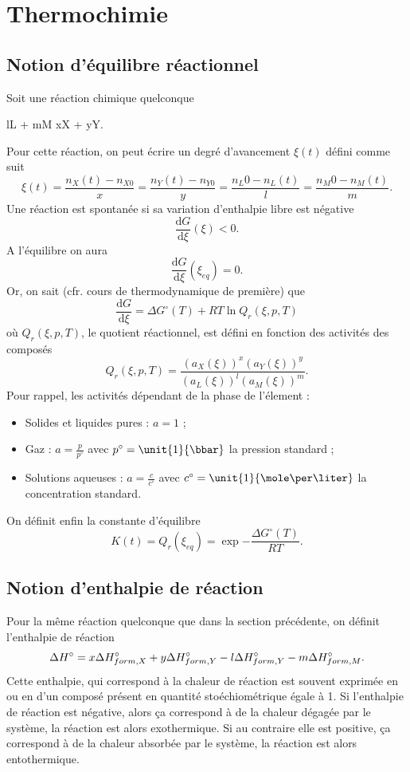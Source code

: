
\newpage
\section{Thermochimie}
\subsection{Notion d'équilibre réactionnel}
Soit une réaction chimique quelconque
\begin{chemmath}
	lL + mM  \Leftrightarrow xX + yY.
\end{chemmath}
Pour cette réaction, on peut écrire un
degré d'avancement $\xi(t)$ défini comme
suit
\[ \xi(t) = \frac{n_X(t) - n_{X0}}{x} =
\frac{n_Y(t) - n_{Y0}}{y} = \frac{n_L0 - n_{L}(t)}{l}
= \frac{n_M0 - n_{M}(t)}{m}. \]
Une réaction est spontanée si sa variation
d'enthalpie libre est négative 
\[ \frac{\mathrm{d}G}{\mathrm{d}\xi}(\xi) < 0. \]
A l'équilibre on aura 
\[ \frac{\mathrm{d}G}{\mathrm{d}\xi}(\xi_{eq}) = 0.\]
Or, on sait (cfr. cours de thermodynamique de première) que
\[ \frac{\mathrm{d}G}{\mathrm{d}\xi} = \Delta G^{\circ}(T)
+ RT\ln{Q_r(\xi,p,T)}\]
où $Q_r(\xi,p,T)$, le quotient réactionnel, est
défini en fonction des activités des composés
\[ Q_r(\xi,p,T) = \frac{(a_X(\xi))^x(a_Y(\xi))^y}{(a_L(\xi))^l(a_M(\xi))^m}. \]
Pour rappel, les activités dépendant de la phase
de l'élement :
\begin{itemize}
	\item Solides et liquides pures : $a=1$ ;
	\item Gaz : $a = \frac{p}{p^{\circ}}$ avec
	$p^{\circ} = \unit{1}{\bbar}$ la pression standard ;
	\item Solutions aqueuses : $a = \frac{c}{c^{\circ}}$
	avec $c^{\circ} = \unit{1}{\mole\per\liter}$ la concentration
	standard.
\end{itemize}
On définit enfin la constante d'équilibre 
\[ K(t) = Q_r(\xi_{eq}) = \exp{-\frac{\Delta G^{\circ}(T)}{RT}}. \]

\subsection{Notion d'enthalpie de réaction}
Pour la même réaction quelconque que dans la section
précédente, on définit l'enthalpie de réaction
\[ \Delta H^{\circ} = x\Delta H^{\circ}_{form,X} + y\Delta H^{\circ}_{form,Y}
- l\Delta H^{\circ}_{form,Y} - m\Delta H^{\circ}_{form,M}.\]
Cette enthalpie, qui correspond à la chaleur de réaction 
est souvent exprimée en \unit{}{\joule\per\kilo\gram}
ou en \unit{}{\joule\per\mole} d'un composé présent en quantité
stoéchiométrique égale à 1. Si l'enthalpie de réaction est négative,
alors ça correspond à de la chaleur dégagée par le
système, la réaction est alors exothermique. Si au contraire
elle est positive, ça correspond à de la chaleur absorbée
par le système, la réaction est alors entothermique.

